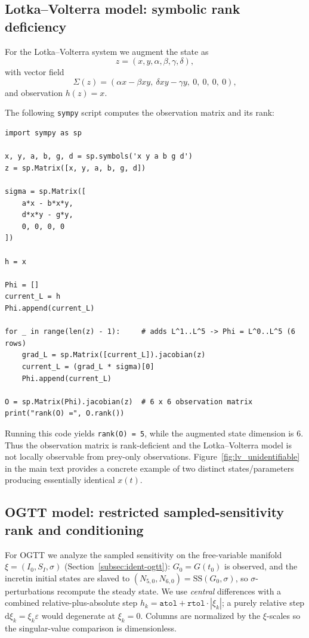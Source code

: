 \subsection{Lotka--Volterra model: symbolic rank deficiency}
\label{app:obs-lv}

For the Lotka--Volterra system we augment the state as
\[
z = (x,y,\alpha,\beta,\gamma,\delta),
\]
with vector field
\[
\Sigma(z) =
(\alpha x - \beta x y,\ \delta x y - \gamma y,\ 0,\ 0,\ 0,\ 0),
\]
and observation $h(z)=x$.

The following \texttt{sympy} script computes the observation matrix and its rank:

\begin{verbatim}
import sympy as sp

x, y, a, b, g, d = sp.symbols('x y a b g d')
z = sp.Matrix([x, y, a, b, g, d])

sigma = sp.Matrix([
    a*x - b*x*y,
    d*x*y - g*y,
    0, 0, 0, 0
])

h = x

Phi = []
current_L = h
Phi.append(current_L)

for _ in range(len(z) - 1):     # adds L^1..L^5 -> Phi = L^0..L^5 (6 rows)
    grad_L = sp.Matrix([current_L]).jacobian(z)
    current_L = (grad_L * sigma)[0]
    Phi.append(current_L)

O = sp.Matrix(Phi).jacobian(z)  # 6 x 6 observation matrix
print("rank(O) =", O.rank())
\end{verbatim}

Running this code yields \texttt{rank(O) = 5}, while the augmented state dimension is $6$.
Thus the observation matrix is rank-deficient and the Lotka--Volterra model is not locally observable from prey-only observations.
Figure~\ref{fig:lv_unidentifiable} in the main text provides a concrete example of two distinct states/parameters producing essentially identical $x(t)$.

\subsection{OGTT model: restricted sampled-sensitivity rank and conditioning}
\label{app:obs-ogtt}

For OGTT we analyze the sampled sensitivity on the free-variable manifold $\xi=(I_0,S_I,\sigma)$
(Section~\ref{subsec:ident-ogtt}): $G_0=G(t_0)$ is observed, and the incretin initial states are slaved to
$(N_{5,0},N_{6,0})=\mathrm{SS}(G_0,\sigma)$, so $\sigma$-perturbations recompute the steady state. We use
\emph{central} differences with a combined relative-plus-absolute step $h_k=\texttt{atol}+\texttt{rtol}\cdot|\xi_k|$;
a purely relative step $\mathrm{d}\xi_k=\xi_k\varepsilon$ would degenerate at $\xi_k=0$. Columns are
normalized by the $\xi$-scales so the singular-value comparison is dimensionless.

